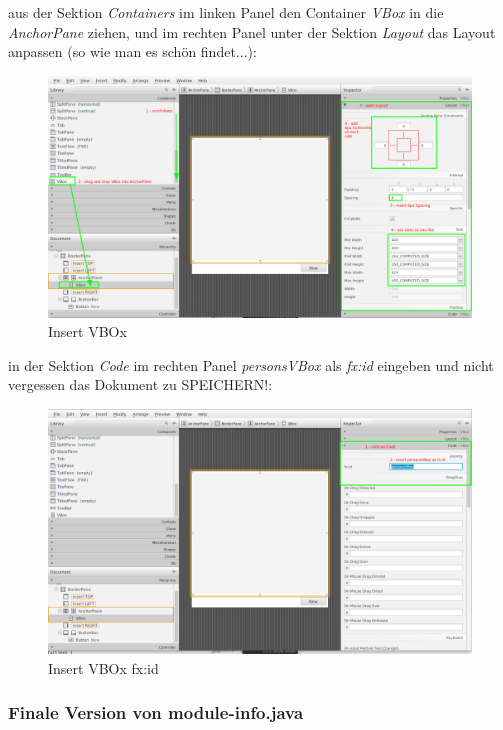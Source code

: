 \documentclass[11pt]{scrartcl}
\begin{document}
\newpage
aus der Sektion \textit{Containers} im linken Panel den Container \textit{VBox}
in die \textit{AnchorPane} ziehen, und im rechten Panel unter der Sektion
\textit{Layout} das Layout anpassen (so wie man es schön findet...):
\begin{figure}[!ht]
    \includegraphics[width=\linewidth]{images/eclipse30_insert_vbox.png}
    \caption{Insert VBOx}
    \label{fig:insertvbox}
\end{figure}

\newpage
in der Sektion \textit{Code} im rechten Panel \textit{personsVBox} als \textit{fx:id}
eingeben und nicht vergessen das Dokument zu SPEICHERN!:
\begin{figure}[!ht]
    \includegraphics[width=\linewidth]{images/eclipse31_insert_id.png}
    \caption{Insert VBOx fx:id}
    \label{fig:insertvboxfxid}
\end{figure}

\newpage
\subsubsection{Finale Version von module-info.java}
\label{sec:finalizemoduleinfo}
\end{document}
